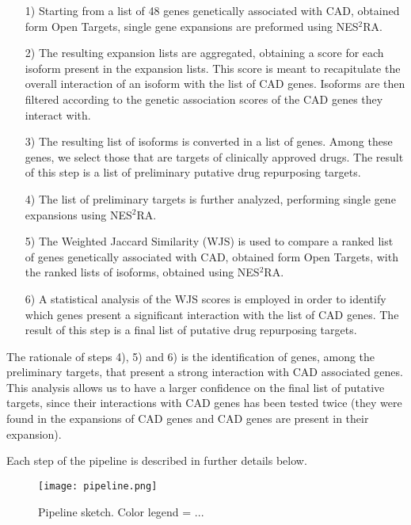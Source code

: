 \documentclass[fleqn,10pt]{SelfArx} %
\begin{document}
\begin{itemize}[leftmargin=*]
	\item[1)] Starting from a list of 48 genes genetically associated with CAD, obtained form Open Targets, single gene expansions are preformed using NES$^2$RA.
	\item[2)] The resulting expansion lists are aggregated, obtaining a score for each isoform present in the expansion lists. This score is meant to recapitulate the overall interaction of an isoform with the list of CAD genes. Isoforms are then filtered according to the genetic association scores of the CAD genes they interact with.
	\item[3)] The resulting list of isoforms is converted in a list of genes. Among these genes, we select those that are targets of clinically approved drugs. The result of this step is a list of preliminary putative drug repurposing targets.
	\item[4)] The list of preliminary targets is further analyzed, performing single gene expansions using NES$^2$RA.
	\item[5)] The Weighted Jaccard Similarity (WJS) is used to compare a ranked list of genes genetically associated with CAD, obtained form Open Targets, with the ranked lists of isoforms, obtained using NES$^2$RA.
	\item[6)] A statistical analysis of the WJS scores is employed in order to identify which genes present a significant interaction with the list of CAD genes. The result of this step is a final list of putative drug repurposing targets.
\end{itemize}

The rationale of steps 4), 5) and 6) is the identification of genes, among the preliminary targets, that present a strong interaction with CAD associated genes. This analysis allows us to have a larger confidence on the final list of putative targets, since their interactions with CAD genes has been tested twice (they were found in the expansions of CAD genes and CAD genes are present in their expansion).

Each step of the pipeline is described in further details below.
 
\cite{OpenTargetPlatform}
\cite{fantom}
\cite{realBoinc}
\cite{WGS}

\begin{figure}
	\texttt{[image: pipeline.png]}
	\caption{Pipeline sketch. Color legend = ...}
	\label{Fig:pipe}
\end{figure}
\end{document}
